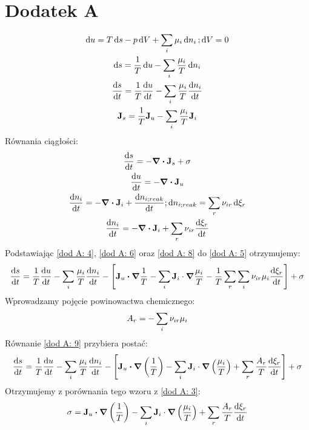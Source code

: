 \documentclass[10pt, a4paper, twoside, onecolumn]{article}
\numberwithin{equation}{section}
\begin{document}
	\section*{Dodatek A}\label{sec: dodatek A}
	\begin{gather}
		\dd{u}=T\dd{s}-p\dd{V}+\sum_{i}\mu_{i}\dd{n_{i}}; \dd{V}=0 \label{dod A: 1} \\
		\dd{s}=\frac{1}{T}\dd{u}-\sum_{i}\frac{\mu_{i}}{T}\dd{n_{i}} \label{dod A: 2} \\
		\dv{s}{t}=\frac{1}{T}\dv{u}{t}-\sum_{i}\frac{\mu_{i}}{T}\dv{n_{i}}{t} \label{dod A: 3} \\
		\vb{J}_{s}=\frac{1}{T}\vb{J}_{u}-\sum_{i}\frac{\mu_{i}}{T}\vb{J}_{i} \label{dod A: 4}
	\end{gather}
	Równania ciągłości:
	\begin{gather}
		\dv{s}{t}=-\div{\vb{J}_{s}}+\sigma \label{dod A: 5} \\
		\dv{u}{t}=-\div{\vb{J}_{u}} \label{dod A: 6} \\
		\dv{n_{i}}{t}=-\div{\vb{J}_{i}}+\dv{n_{i;reak}}{t}; \dd{n_{i;reak}}=\sum_{r}\nu_{ir}\dd{\xi_{r}} \label{dod A: 7} \\
		\dv{n_{i}}{t}=-\div{\vb{J}_{i}}+\sum_{r}\nu_{ir}\dv{\xi_{r}}{t} \label{dod A: 8}
	\end{gather}
	Podstawiając \eqref{dod A: 4}, \eqref{dod A: 6} oraz \eqref{dod A: 8} do \eqref{dod A: 5} otrzymujemy: 
	\begin{equation} \label{dod A: 9}
		\dv{s}{t}=\frac{1}{T}\dv{u}{t}-\sum_{i}\frac{\mu_{i}}{T}\dv{n_{i}}{t}-\left[\vb{J}_{u}\vdot\grad{\frac{1}{T}}-\sum_{i}\vb{J}_{i}\cdot\grad{\frac{\mu_{i}}{T}}-\frac{1}{T}\sum_{r}\sum_{i}\nu_{ir}\mu_{i}\dv{\xi_{r}}{t}\right]+\sigma
	\end{equation}
	Wprowadzamy pojęcie powinowactwa chemicznego: 
	\begin{equation}
		A_{r}=-\sum_{i}\nu_{ir}\mu_{i} \\
	\end{equation}
	Równanie \eqref{dod A: 9} przybiera postać:
	\begin{equation}
		\dv{s}{t}=\frac{1}{T}\dv{u}{t}-\sum_{i}\frac{\mu_{i}}{T}\dv{n_{i}}{t}-\left[\vb{J}_{u}\vdot\grad{\left(\frac{1}{T}\right)}-\sum_{i}\vb{J}_{i}\cdot\grad{\left(\frac{\mu_{i}}{T}\right)}+\sum_{r}\frac{A_{r}}{T}\dv{\xi_{r}}{t}\right]+\sigma
	\end{equation}
	Otrzymujemy z porównania tego wzoru z \eqref{dod A: 3}:
	\begin{equation}
		\sigma=\vb{J}_{u}\vdot\grad{\left(\frac{1}{T}\right)}-\sum_{i}\vb{J}_{i}\cdot\grad{\left(\frac{\mu_{i}}{T}\right)}+\sum_{r}\frac{A_{r}}{T}\dv{\xi_{r}}{t}
	\end{equation}
\end{document}

